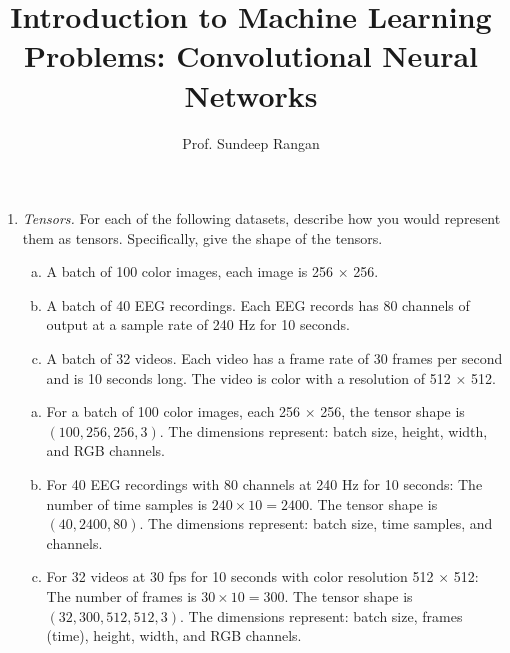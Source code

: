 \documentclass[11pt]{article}
\begin{document}
\title{Introduction to Machine Learning\\
Problems:  Convolutional Neural Networks}
\author{Prof. Sundeep Rangan}
\date{}

\maketitle

\begin{enumerate}

\item \emph{Tensors.}  For each of the following datasets, describe how you
would represent them as tensors.  Specifically, give the shape of the tensors.
\begin{enumerate}[(a)]
\item A batch of 100 color images, each image is 256 $\times$ 256.

\item A batch of 40 EEG recordings.  Each EEG records has 80 channels of output
at a sample rate of 240 Hz for 10 seconds.

\item A batch of 32 videos.  Each video has a frame rate of 30 frames per second
and is 10 seconds long.  The video is color with a resolution of 512 $\times$ 512.
\end{enumerate}

\begin{solution}
\begin{enumerate}[(a)]
\item For a batch of 100 color images, each 256 $\times$ 256, the tensor shape is $(100, 256, 256, 3)$.
The dimensions represent: batch size, height, width, and RGB channels.

\item For 40 EEG recordings with 80 channels at 240 Hz for 10 seconds:
The number of time samples is $240 \times 10 = 2400$.
The tensor shape is $(40, 2400, 80)$.
The dimensions represent: batch size, time samples, and channels.

\item For 32 videos at 30 fps for 10 seconds with color resolution 512 $\times$ 512:
The number of frames is $30 \times 10 = 300$.
The tensor shape is $(32, 300, 512, 512, 3)$.
The dimensions represent: batch size, frames (time), height, width, and RGB channels.
\end{enumerate}
\end{solution}


\end{enumerate}
\end{document}

